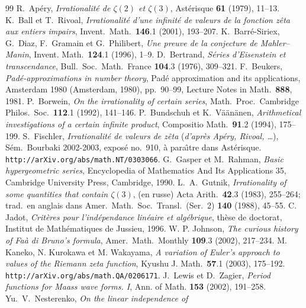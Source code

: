 \documentclass[12pt]{amsart}
\theoremstyle{remark}
\numberwithin{equation}{section}
\begin{document}
\begin{thebibliography}{99}
 R.~Ap{\'e}ry, {\em Irrationalit{\'e} de $\zeta(2)$
 et $\zeta(3)$}, Ast{\'e}risque {\bf 61} (1979), 11--13. 
 K.~Ball et T.~Rivoal, {\em Irrationalit{\'e}
d'une
infinit{\'e} de valeurs de la fonction z{\^e}ta aux entiers impairs},
Invent.\ Math.\ {\bf 146}.1 (2001), 193--207.
 K.~Barr{\'e}-Siriex, G.~Diaz, F.~Gramain et 
G.~Philibert, {\it Une preuve de la conjecture de Mahler--Manin}, Invent.
Math.\ {\bf 124}.1 (1996), 1--9.
 D.~Bertrand, {\it
S{\'e}ries d'Eisenstein et transcendance}, 
Bull.\ Soc.\ Math.\ France {\bf 104}.3 (1976), 309--321.
 F.~Beukers, {\it Pad{\'e}-approximations in number theory},  
Pad{\'e} approximation and its applications, Amsterdam 1980 (Amsterdam, 1980), pp.~90--99, 
Lecture Notes in Math.\ {\bf 888},  1981. 
 P.~Borwein, {\it On the irrationality of certain
    series},  
Math.\ Proc.\ Cambridge Philos.\ Soc.\ {\bf 112}.1 (1992), 141--146.
 P.~Bundschuh et K.~V{\"a}{\"a}n{\"a}nen, {\it  
Arithmetical investigations of a certain infinite product},  
Compositio Math.\ {\bf 91}.2 (1994), 175--199.
 S.~Fischler, {\it Irrationalit{\'e} de valeurs de
z{\^e}ta\/} ({\it d'apr{\`e}s Ap{\'e}ry, Rivoal, \dots}), 
S{\'e}m.\ Bourbaki 2002-2003,
expos{\'e}
no.~910, {\`a} para{\^\i}tre dans Ast{\'e}risque.
{\tt http\!\!\!://arXiv.org/abs/math.NT/0303066}.
 G.~Gasper et M.~Rahman, {\em Basic hypergeometric series},
Encyclopedia of Mathematics And Its Applications 35, Cambridge
University Press, Cambridge, 1990.
 L.~A.~Gutnik, {\it Irrationality of some quantities that
    contain $\zeta (3)$}, (en russe) Acta Arith.\ {\bf 42}.3 (1983), 255--264;
trad.\ en anglais dans Amer.\ Math.\ Soc.\ Transl.\ (Ser.~2) {\bf 140} 
(1988), 45--55.
 C. Jadot,
{\it Crit{\`e}res pour l'ind{\'e}pendance lin{\'e}aire et alg{\'e}brique},
th{\`e}se de doctorat, Institut de Math{\'e}matiques de Jussieu, 1996.
 W. P. Johnson, {\it The curious history of Fa{\`a} 
di Bruno's formula}, Amer.\ Math.\ Monthly {\bf109}.3 (2002), 217--234.
 M. Kaneko, N. Kurokawa et M. Wakayama,
{\it A variation of Euler's approach to values of the Riemann zeta function},
Kyushu J. Math.\ {\bf 57}.1 (2003), 175--192.
{\tt http\!\!\!://arXiv.org/abs/math.QA/0206171}.
 J.~Lewis et D.~Zagier, {\it Period functions for Maass wave forms. I}, 
Ann. of Math. {\bf 153} (2002), 191--258.
 Yu.~V.~Nesterenko, \textit{On the linear independence of 
}
\end{thebibliography}
\end{document}
